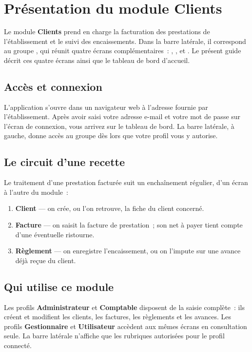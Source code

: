 \chapter{Présentation du module Clients}

Le module \textbf{Clients} prend en charge la facturation des prestations de l'établissement et le suivi des encaissements. Dans la barre latérale, il correspond au groupe , qui réunit quatre écrans complémentaires~: , ,  et . Le présent guide décrit ces quatre écrans ainsi que le tableau de bord d'accueil.

\section{Accès et connexion}
L'application s'ouvre dans un navigateur web à l'adresse fournie par l'établissement. Après avoir saisi votre adresse e-mail et votre mot de passe sur l'écran de connexion, vous arrivez sur le tableau de bord. La barre latérale, à gauche, donne accès au groupe  dès lors que votre profil vous y autorise.

\section{Le circuit d'une recette}
Le traitement d'une prestation facturée suit un enchaînement régulier, d'un écran à l'autre du module~:

\begin{enumerate}
  \item \textbf{Client} --- on crée, ou l'on retrouve, la fiche du client concerné.
  \item \textbf{Facture} --- on saisit la facture de prestation~; son net à payer tient compte d'une éventuelle ristourne.
  \item \textbf{Règlement} --- on enregistre l'encaissement, ou on l'impute sur une avance déjà reçue du client.
\end{enumerate}

\section{Qui utilise ce module}
Les profils \textbf{Administrateur} et \textbf{Comptable} disposent de la saisie complète~: ils créent et modifient les clients, les factures, les règlements et les avances. Les profils \textbf{Gestionnaire} et \textbf{Utilisateur} accèdent aux mêmes écrans en consultation seule. La barre latérale n'affiche que les rubriques autorisées pour le profil connecté.

